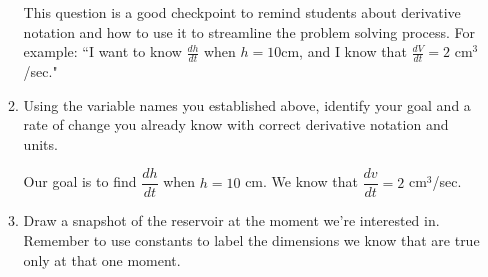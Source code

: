 \documentclass{article}
\begin{document}
\begin{enumerate}
\begin{enumerate}
\begin{solution}
    \begin{center}
         \hspace{0.5in}
        \end{center}
\end{solution}
\begin{workshop}
    This question is a good checkpoint to remind students about derivative notation and how to use it to streamline the problem solving process. For example: ``I want to know $\frac{dh}{dt}$ when $h=10$cm, and I know that $\frac{dV}{dt}=2$ cm$^3$/sec." 
\end{workshop}
\item Using the variable names you established above, identify your goal and a rate of change you already know with correct derivative notation and units.

\begin{solution}
    Our goal is to find $\dfrac{dh}{dt}$ when $h=10$ cm. We know that $\dfrac{dv}{dt}=2$ cm$^3$/sec.
    \end{solution}
\pspace{\vfill\vfill}
\item Draw a snapshot of the reservoir at the moment we're interested in. Remember to use constants to  label the dimensions we know that are true only at that one moment.
\probonly{\begin{center}
    


\end{center}}
\end{enumerate}
\end{enumerate}
\end{document}
